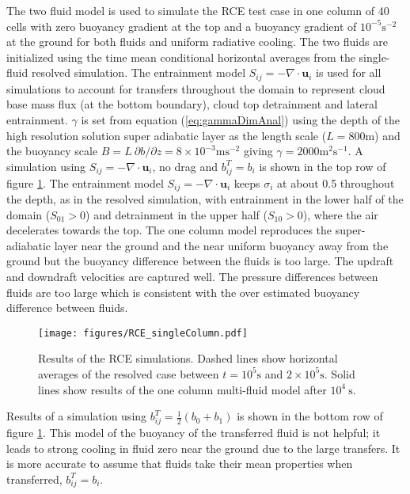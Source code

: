 \documentclass[draft]{agujournal2019}
\begin{document}
The two fluid model is used to simulate the RCE test case in one
column of 40 cells with zero buoyancy gradient at the top and a buoyancy
gradient of $10^{-5}\text{s}^{-2}$ at the ground for both fluids
and uniform radiative cooling. The two fluids are initialized using
the time mean conditional horizontal averages from the single-fluid
resolved simulation. The entrainment model $S_{ij}=-\nabla\cdot\mathbf{u}_{i}$
is used for all simulations to account for transfers throughout the
domain to represent cloud base mass flux (at the bottom boundary),
cloud top detrainment and lateral entrainment. $\gamma$ is set from
equation (\ref{eq:gammaDimAnal}) using the depth of the high resolution solution super adiabatic
layer as the length scale ($L=800\text{m}$) and the buoyancy scale
$B=L\ \partial b/\partial z=8\times10^{-3}\text{m}\text{s}^{-2}$
giving $\gamma=2000\text{m}^{2}\text{s}^{-1}$. 
A simulation using
$S_{ij}=-\nabla\cdot\mathbf{u}_{i}$, no drag and $b_{ij}^{T}=b_{i}$
is shown in the top row of figure \ref{fig:RCE_singleColumn}.
The entrainment model $S_{ij}=-\nabla\cdot\mathbf{u}_{i}$ keeps $\sigma_{i}$
at about 0.5 throughout the depth, as in the resolved simulation,
with entrainment in the lower half of the domain ($S_{01}>0$) and
detrainment in the upper half ($S_{10}>0$), where the air decelerates
towards the top. The one column model reproduces the super-adiabatic
layer near the ground and the near uniform buoyancy away from the
ground but the buoyancy difference between the fluids is too large.
The updraft and downdraft velocities are captured well. The pressure
differences between fluids are too large which is consistent with
the over estimated buoyancy difference between fluids. 

\begin{figure}
\noindent
\texttt{[image: figures/RCE\_singleColumn.pdf]}
\caption{\label{fig:RCE_singleColumn}
Results of the RCE simulations. Dashed lines show horizontal averages
of the resolved case between $t=10^{5}\text{s}$ and $2\times10^{5}\text{s}$. Solid lines show results of the one column multi-fluid model after $10^{4}\ \text{s}$. }
\end{figure}

Results of a simulation using $b_{ij}^{T}=\frac{1}{2}(b_{0}+b_{1})$
is shown in the bottom row of figure \ref{fig:RCE_singleColumn}.
This model of the buoyancy of the transferred fluid is not helpful; it leads
to strong cooling in fluid zero near the ground due to the large transfers.
It is more accurate to assume that fluids take their mean properties
when transferred, $b_{ij}^{T}=b_{i}$. 
\end{document}
